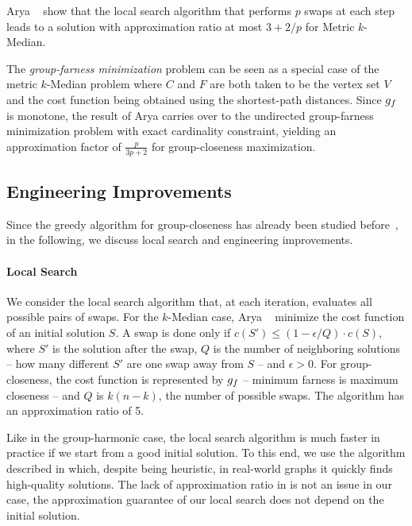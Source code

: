 Arya \etal~\cite{DBLP:journals/siamcomp/AryaGKMMP04} show that the local search algorithm
that performs $p$ swaps at each step leads to a solution with approximation ratio
at most $3 + 2/p$ for Metric $k$-Median.

The \emph{group-farness minimization} problem can be seen as a special case of the metric
$k$-Median problem where $C$ and $F$ are both taken to be the vertex set $V$ and
the cost function being obtained using the shortest-path distances. Since $g_f$
is monotone, the result of Arya \etal carries over to the undirected group-farness
minimization problem with exact cardinality constraint, yielding an approximation factor
of $\frac{p}{3p + 2}$ for group-closeness maximization.

\subsection{Engineering Improvements}
%

Since the greedy algorithm for group-closeness has already been studied
before~\cite{DBLP:conf/alenex/BergaminiGM18}, in the following, we discuss
local search and engineering improvements.

\paragraph{Local Search}
%
We consider the local search algorithm that, at each iteration, evaluates all
possible pairs of swaps. For the $k$-Median case, Arya
\etal~\cite{DBLP:journals/siamcomp/AryaGKMMP04} minimize the cost function of an
initial solution $S$. A swap is done only if $c(S') \le (1 - \epsilon/Q)\cdot c(S)$,
where $S'$ is the solution after the swap, $Q$ is the number of neighboring solutions
-- \ie how many different $S'$ are one swap away from $S$ -- and $\epsilon > 0$.
For group-closeness, the cost function is represented by $g_f$ -- minimum farness
is maximum closeness -- and $Q$ is $k(n - k)$, \ie the number of possible
swaps. The algorithm has an approximation ratio of 5.

Like in the group-harmonic case, the local search algorithm is much faster in practice
if we start from a good initial solution. To this end, we use the \growshrink
algorithm described in  which, despite being heuristic,
in real-world graphs it quickly finds high-quality solutions. The lack of approximation
ratio in \growshrink is not an issue in our case, the approximation guarantee of our
local search does not depend on the initial solution.

